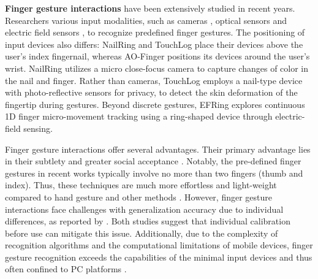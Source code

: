 \documentclass[review]{fcs}
\newcommand{\revise}[2]{\textcolor[rgb]{0,0,0}{#2}}
\begin{document}
\textbf{Finger gesture interactions} have been extensively studied in recent years. Researchers various input modalities, such as cameras \cite{DBLP:conf/ismar/LiLMHLS22}, optical sensors \cite{DBLP:conf/iswc/KitamuraYS23, DBLP:conf/chi/XuZKN23} and electric field sensors \cite{DBLP:journals/imwut/ChenLYZ22}, to recognize predefined finger gestures. 
\revise{The positioning of input devices also varies: NailRing \cite{DBLP:conf/ismar/LiLMHLS22} and TouchLog \cite{DBLP:conf/iswc/KitamuraYS23} placed their devices above the user's index fingernail.}{The positioning of input devices also differs: NailRing \cite{DBLP:conf/ismar/LiLMHLS22} and TouchLog \cite{DBLP:conf/iswc/KitamuraYS23} place their devices above the user's index fingernail, whereas AO-Finger \cite{DBLP:conf/chi/XuZKN23} positions its devices around the user's wrist}. 
\revise{NailRing utilized a micro close-focus camera to capture changes of color in the nail and finger \cite{DBLP:conf/ismar/LiLMHLS22}.}{NailRing\cite{DBLP:conf/ismar/LiLMHLS22} utilizes a micro close-focus camera to capture changes of color in the nail and finger.} 
\revise{Rather than cameras, TouchLog employed a nail-type device with photo-reflective sensors for privacy, to detect the skin deformation of the fingertip during gestures \cite{DBLP:conf/iswc/KitamuraYS23}.}{Rather than cameras, TouchLog \cite{DBLP:conf/iswc/KitamuraYS23} employs a nail-type device with photo-reflective sensors for privacy, to detect the skin deformation of the fingertip during gestures.} 
\revise{Beyond discrete gestures, EFRing explored continuous 1D finger micro-movement tracking using a ring-shaped device through electric-field sensing \cite{DBLP:journals/imwut/ChenLYZ22}.}{Beyond discrete gestures, EFRing \cite{DBLP:journals/imwut/ChenLYZ22} explores continuous 1D finger micro-movement tracking using a ring-shaped device through electric-field sensing.}

Finger gesture interactions offer several advantages. Their primary advantage lies in their subtlety and greater social acceptance \cite{DBLP:conf/ismar/LiLMHLS22, DBLP:conf/iswc/KitamuraYS23, DBLP:conf/chi/XuZKN23, DBLP:journals/imwut/ChenLYZ22}. Notably, the pre-defined finger gestures in recent works typically involve no more than two fingers (thumb and index). Thus, these techniques are much more effortless and light-weight compared to hand gesture and other methods \cite{DBLP:conf/chi/XuZKN23}. However, finger gesture interactions face challenges with generalization accuracy due to individual differences, as reported by \cite{DBLP:conf/iswc/KitamuraYS23, DBLP:conf/ismar/LiLMHLS22}. Both studies suggest that individual calibration before use can mitigate this issue. Additionally, due to the complexity of recognition algorithms and the computational limitations of mobile devices, finger gesture recognition exceeds the capabilities of the minimal input devices and thus often confined to PC platforms \cite{DBLP:conf/chi/XuZKN23, DBLP:journals/imwut/ChenLYZ22}.
\end{document}
